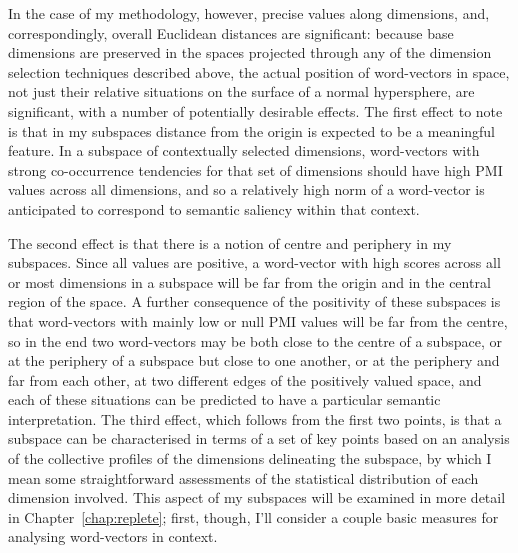In the case of my methodology, however, precise values along dimensions, and, correspondingly, overall Euclidean distances are significant: because base dimensions are preserved in the spaces projected through any of the dimension selection techniques described above, the actual position of word-vectors in space, not just their relative situations on the surface of a normal hypersphere, are significant, with a number of potentially desirable effects.  The first effect to note is that in my subspaces distance from the origin is expected to be a meaningful feature.  In a subspace of contextually selected dimensions, word-vectors with strong co-occurrence tendencies for that set of dimensions should have high PMI values across all dimensions, and so a relatively high norm of a word-vector is anticipated to correspond to semantic saliency within that context.

The second effect is that there is a notion of centre and periphery in my subspaces.  Since all values are positive, a word-vector with high scores across all or most dimensions in a subspace will be far from the origin and in the central region of the space.  A further consequence of the positivity of these subspaces is that word-vectors with mainly low or null PMI values will be far from the centre, so in the end two word-vectors may be both close to the centre of a subspace, or at the periphery of a subspace but close to one another, or at the periphery and far from each other, at two different edges of the positively valued space, and each of these situations can be predicted to have a particular semantic interpretation.  The third effect, which follows from the first two points, is that a subspace can be characterised in terms of a set of key points based on an analysis of the collective profiles of the dimensions delineating the subspace, by which I mean some straightforward assessments of the statistical distribution of each dimension involved.  This aspect of my subspaces will be examined in more detail in Chapter~\ref{chap:replete}; first, though, I'll consider a couple basic measures for analysing word-vectors in context.

